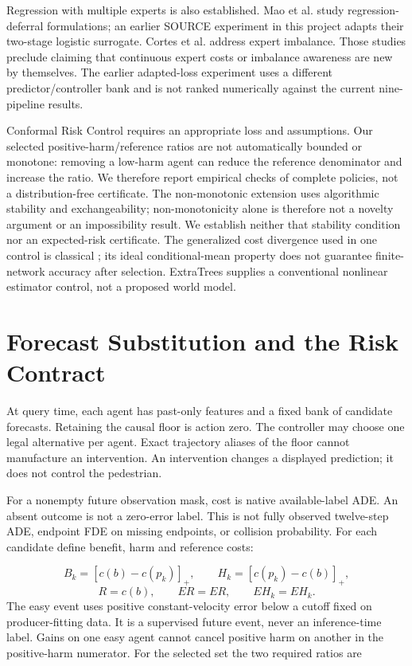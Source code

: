 \documentclass[10pt,twocolumn,letterpaper]{article}
\begin{document}
Regression with multiple experts is also established. Mao et al. \cite{ref3} study
regression-deferral formulations; an earlier SOURCE experiment in this project
adapts their two-stage logistic surrogate. Cortes et al. \cite{ref4} address expert
imbalance. Those studies preclude claiming that continuous expert costs or
imbalance awareness are new by themselves. The earlier adapted-loss experiment
uses a different predictor/controller bank and is not ranked numerically against
the current nine-pipeline results.

Conformal Risk Control \cite{ref5} requires an appropriate loss and assumptions. Our
selected positive-harm/reference ratios are not automatically bounded or
monotone: removing a low-harm agent can reduce the reference denominator and
increase the ratio. We therefore report empirical checks of complete policies,
not a distribution-free certificate. The non-monotonic extension \cite{ref10} uses
algorithmic stability and exchangeability; non-monotonicity alone is therefore
not a novelty argument or an impossibility result. We establish neither that
stability condition nor an expected-risk certificate. The generalized cost divergence used in
one control is classical \cite{ref7}; its ideal conditional-mean property does not
guarantee finite-network accuracy after selection. ExtraTrees \cite{ref8} supplies a
conventional nonlinear estimator control, not a proposed world model.

\section{Forecast Substitution and the Risk Contract}
At query time, each agent has past-only features and a fixed bank of candidate
forecasts. Retaining the causal floor is action zero. The controller may choose
one legal alternative per agent. Exact trajectory aliases of the floor cannot
manufacture an intervention. An intervention changes a displayed prediction;
it does not control the pedestrian.

For a nonempty future observation mask, cost is native available-label ADE.
An absent outcome is not a zero-error label. This is not fully observed
twelve-step ADE, endpoint FDE on missing endpoints, or collision probability.
For each candidate define benefit, harm and reference costs:

\begin{equation}
B_k=[c(b)-c(p_k)]_+,\qquad H_k=[c(p_k)-c(b)]_+,
\end{equation}
\begin{equation}
R=c(b),\qquad ER=E R,\qquad EH_k=E H_k.
\end{equation}
The easy event uses positive constant-velocity error below a cutoff fixed on
producer-fitting data. It is a supervised future event, never an inference-time
label. Gains on one easy agent cannot cancel positive harm on another in the
positive-harm numerator. For the selected set the two required ratios are
\end{document}
